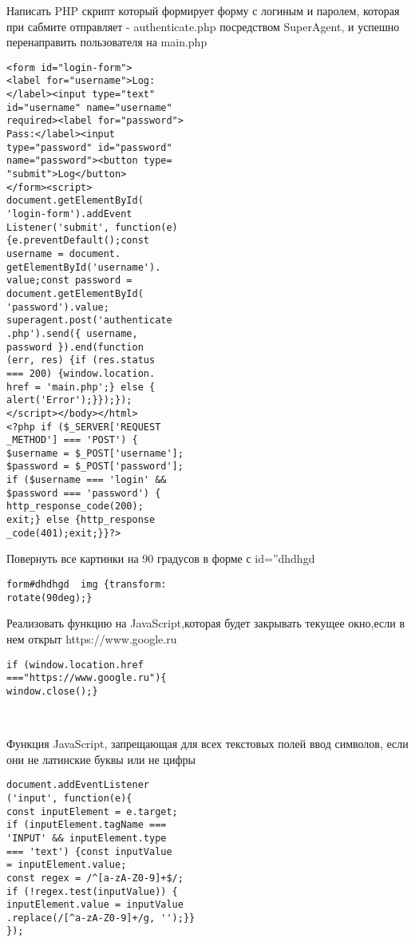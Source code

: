 \documentclass{article}
\begin{document}
\begin{minipage}{.2\textwidth}
Написать PHP скрипт который формирует форму с логиным и паролем, которая при сабмите отправляет - authenticate.php посредством SuperAgent, и успешно перенаправить пользователя на main.php
\begin{lstlisting}
<form id="login-form">
<label for="username">Log:
</label><input type="text" 
id="username" name="username" 
required><label for="password">
Pass:</label><input 
type="password" id="password" 
name="password"><button type=
"submit">Log</button>
</form><script>
document.getElementById(
'login-form').addEvent
Listener('submit', function(e) 
{e.preventDefault();const
username = document.
getElementById('username').
value;const password = 
document.getElementById(
'password').value;
superagent.post('authenticate
.php').send({ username, 
password }).end(function 
(err, res) {if (res.status
=== 200) {window.location.
href = 'main.php';} else {
alert('Error');}});});
</script></body></html>
<?php if ($_SERVER['REQUEST
_METHOD'] === 'POST') {
$username = $_POST['username'];
$password = $_POST['password'];
if ($username === 'login' && 
$password === 'password') {
http_response_code(200);
exit;} else {http_response
_code(401);exit;}}?>    
\end{lstlisting}
\end{minipage}
\hfill
\begin{minipage}{.2\textwidth}
Повернуть все картинки на 90 градусов в форме с id=”dhdhgd
\begin{lstlisting}
form#dhdhgd  img {transform:
rotate(90deg);}
\end{lstlisting}
\end{minipage}
\hfill
\begin{minipage}{.2\textwidth}
Реализовать функцию на JavaScript,которая будет закрывать текущее окно,если в нем открыт https://www.google.ru
\begin{lstlisting}
if (window.location.href 
==="https://www.google.ru"){
window.close();} 
\end{lstlisting}
\end{minipage}
\\
\begin{minipage}{.2\textwidth}
Функция JavaScript, запрещающая для всех текстовых полей ввод символов, если они не латинские буквы или не цифры
\begin{lstlisting}
document.addEventListener
('input', function(e){
const inputElement = e.target;
if (inputElement.tagName === 
'INPUT' && inputElement.type 
=== 'text') {const inputValue 
= inputElement.value;
const regex = /^[a-zA-Z0-9]+$/;
if (!regex.test(inputValue)) {
inputElement.value = inputValue
.replace(/[^a-zA-Z0-9]+/g, '');}}
});  
\end{lstlisting}
\end{minipage}
\end{document}
